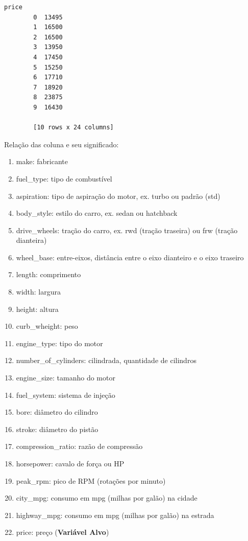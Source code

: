 \documentclass[11pt]{article}
\providecommand{\tightlist}{%
      \setlength{\itemsep}{0pt}\setlength{\parskip}{0pt}}
\begin{document}
\begin{Verbatim}[commandchars=\\\{\}]
           price  
        0  13495  
        1  16500  
        2  16500  
        3  13950  
        4  17450  
        5  15250  
        6  17710  
        7  18920  
        8  23875  
        9  16430  
        
        [10 rows x 24 columns]
\end{Verbatim}
            
    Relação das coluna e seu significado:

\begin{enumerate}
\def\labelenumi{\arabic{enumi}.}
\tightlist
\item
  make: fabricante
\item
  fuel\_type: tipo de combustível
\item
  aspiration: tipo de aspiração do motor, ex. turbo ou padrão (std)
\item
  body\_style: estilo do carro, ex. sedan ou hatchback
\item
  drive\_wheels: tração do carro, ex. rwd (tração traseira) ou frw
  (tração dianteira)
\item
  wheel\_base: entre-eixos, distância entre o eixo dianteiro e o eixo
  traseiro
\item
  length: comprimento
\item
  width: largura
\item
  height: altura
\item
  curb\_wheight: peso
\item
  engine\_type: tipo do motor
\item
  number\_of\_cylinders: cilindrada, quantidade de cilindros
\item
  engine\_size: tamanho do motor
\item
  fuel\_system: sistema de injeção
\item
  bore: diâmetro do cilindro
\item
  stroke: diâmetro do pistão
\item
  compression\_ratio: razão de compressão
\item
  horsepower: cavalo de força ou HP
\item
  peak\_rpm: pico de RPM (rotações por minuto)
\item
  city\_mpg: consumo em mpg (milhas por galão) na cidade
\item
  highway\_mpg: consumo em mpg (milhas por galão) na estrada
\item
  price: preço (\textbf{Variável Alvo})
\end{enumerate}
\end{document}
